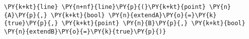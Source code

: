 \begin{Verbatim}[commandchars=\\\{\}]
    \PY{k+kt}{line} \PY{n+nf}{line}\PY{p}{(}\PY{k+kt}{point} \PY{n}{A}\PY{p}{,} \PY{k+kt}{bool} \PY{n}{extendA}\PY{o}{=}\PY{k}{true}\PY{p}{,} \PY{k+kt}{point} \PY{n}{B}\PY{p}{,} \PY{k+kt}{bool} \PY{n}{extendB}\PY{o}{=}\PY{k}{true}\PY{p}{)}
\end{Verbatim}
